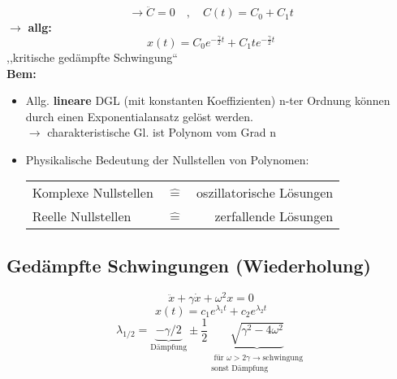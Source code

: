 \documentclass[titlepage,12pt,a4paper,ngerman]{report}
\newcommand{\tx}[1]{\textrm{#1}}
\newcommand{\ub}[1]{\underbrace{#1}}
\begin{document}
$$\rightarrow \ddot{C} = 0 \quad , \quad C(t) = C_0 + C_1 t$$
$\rightarrow$ \textbf{allg:} 
$$x(t) = C_0  e ^{-\frac{\gamma}{2}t} + C_1 t  e ^{-\frac{\gamma}{2}t}$$
,,kritische gedämpfte Schwingung``\\
\textbf{Bem:}
\begin{itemize}
	\item Allg. \textbf{lineare} DGL (mit konstanten Koeffizienten) n-ter Ordnung können durch einen Exponentialansatz gelöst werden.\\
	$\rightarrow$ charakteristische Gl. ist Polynom vom Grad n
	\item Physikalische Bedeutung der Nullstellen von Polynomen:\\
	\begin{tabular}{lcr}
		Komplexe Nullstellen & $\widehat{=}$ & oszillatorische Lösungen \\
		Reelle Nullstellen & $\widehat{=}$ & zerfallende Lösungen
	\end{tabular}
\end{itemize}

\subsection*{Gedämpfte Schwingungen (Wiederholung)}
$$\ddot{x} + \gamma \dot{x} + \omega^2 x = 0$$
$$ x(t) = c_1 e^{\lambda_1 t} + c_2 e^{\lambda_2 t}$$
$$\lambda_{1/2} = \ub{- \gamma/2}_{\tx{Dämpfung}} \pm \frac{1}{2} \underbrace{\sqrt{\gamma^2 - 4 \omega^2}}_{\substack{\textrm{ für } \omega > 2 \gamma \rightarrow \textrm{schwingung} \\ \textrm{sonst Dämpfung}}}$$ 
\end{document}
